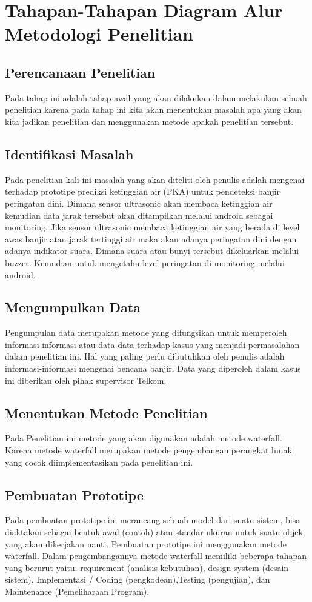 \section{Tahapan-Tahapan Diagram Alur Metodologi Penelitian}
\subsection{Perencanaan Penelitian}
\par Pada tahap ini adalah tahap awal yang akan dilakukan dalam melakukan sebuah penelitian karena pada tahap ini kita akan menentukan masalah apa yang akan kita jadikan penelitian dan menggunakan metode apakah penelitian tersebut.
\subsection{Identifikasi Masalah}
\par Pada penelitian kali ini masalah yang akan diteliti oleh penulis adalah mengenai terhadap prototipe prediksi ketinggian air (PKA) untuk pendeteksi banjir  peringatan  dini. Dimana sensor ultrasonic akan membaca ketinggian air kemudian data jarak tersebut akan ditampilkan melalui android sebagai monitoring. Jika sensor ultrasonic membaca ketinggian air yang berada di level  awas banjir atau jarak tertinggi air maka akan adanya peringatan dini dengan adanya indikator suara. Dimana suara atau bunyi tersebut dikeluarkan melalui buzzer. Kemudian untuk mengetahu level peringatan di monitoring melalui android.   
\subsection{Mengumpulkan Data}
\par Pengumpulan data merupakan metode yang difungsikan untuk memperoleh informasi-informasi atau data-data terhadap kasus yang menjadi permasalahan dalam penelitian ini. Hal yang paling perlu dibutuhkan oleh penulis adalah informasi-informasi mengenai bencana banjir. Data yang diperoleh dalam kasus ini diberikan oleh pihak supervisor Telkom.
\subsection{Menentukan Metode Penelitian}
\par Pada Penelitian ini metode yang akan digunakan adalah metode waterfall. Karena metode waterfall merupakan metode pengembangan perangkat lunak yang cocok diimplementasikan pada penelitian ini. 
\subsection{Pembuatan Prototipe}
Pada pembuatan prototipe ini merancang sebuah model dari suatu sistem, bisa diaktakan sebagai bentuk awal (contoh) atau standar ukuran untuk suatu objek yang akan dikerjakan nanti. Pembuatan prototipe ini menggunakan metode waterfall. Dalam pengembangannya metode waterfall memiliki beberapa tahapan yang berurut yaitu: requirement (analisis kebutuhan), design system (desain sistem), Implementasi / Coding (pengkodean),Testing (pengujian), dan Maintenance (Pemeliharaan Program).
